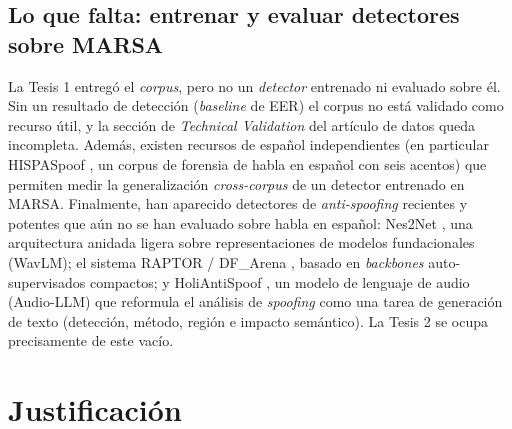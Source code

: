 \documentclass[11pt]{article}
\begin{document}
\subsection{Lo que falta: entrenar y evaluar detectores sobre MARSA}

La Tesis 1 entreg\'o el \emph{corpus}, pero no un \emph{detector}
entrenado ni evaluado sobre \'el. Sin un resultado de detecci\'on
(\emph{baseline} de EER) el corpus no est\'a validado como recurso \'util,
y la secci\'on de \emph{Technical Validation} del art\'iculo de datos
queda incompleta. Adem\'as, existen recursos de espa\~nol independientes
(en particular HISPASpoof \citep{hispaspoof}, un corpus de forensia de
habla en espa\~nol con seis acentos) que permiten medir la
generalizaci\'on \emph{cross-corpus} de un detector entrenado en MARSA.
Finalmente, han aparecido detectores de \emph{anti-spoofing} recientes y
potentes que a\'un no se han evaluado sobre habla en espa\~nol:
Nes2Net \citep{nes2net}, una arquitectura anidada ligera sobre
representaciones de modelos fundacionales (WavLM); el sistema RAPTOR /
DF\_Arena \citep{dfarena}, basado en \emph{backbones} auto-supervisados
compactos; y HoliAntiSpoof \citep{holiantispoof}, un modelo de lenguaje
de audio (Audio-LLM) que reformula el an\'alisis de \emph{spoofing} como
una tarea de generaci\'on de texto (detecci\'on, m\'etodo, regi\'on e
impacto sem\'antico). La Tesis 2 se ocupa precisamente de este vac\'io.

\section{Justificaci\'on}
\end{document}
